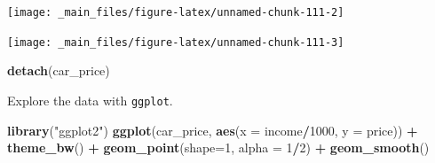 \documentclass[
]{book}
\newenvironment{Shaded}{\begin{snugshade}}{\end{snugshade}}
\newcommand{\CommentTok}[1]{\textcolor[rgb]{0.56,0.35,0.01}{\textit{#1}}}
\newcommand{\DataTypeTok}[1]{\textcolor[rgb]{0.13,0.29,0.53}{#1}}
\newcommand{\DecValTok}[1]{\textcolor[rgb]{0.00,0.00,0.81}{#1}}
\newcommand{\FloatTok}[1]{\textcolor[rgb]{0.00,0.00,0.81}{#1}}
\newcommand{\KeywordTok}[1]{\textcolor[rgb]{0.13,0.29,0.53}{\textbf{#1}}}
\newcommand{\NormalTok}[1]{#1}
\newcommand{\OperatorTok}[1]{\textcolor[rgb]{0.81,0.36,0.00}{\textbf{#1}}}
\newcommand{\StringTok}[1]{\textcolor[rgb]{0.31,0.60,0.02}{#1}}
\begin{document}
\begin{Shaded}
\end{Shaded}

\begin{center}\texttt{[image: \_main\_files/figure-latex/unnamed-chunk-111-2]} \end{center}

\begin{Shaded}
\end{Shaded}

\begin{center}\texttt{[image: \_main\_files/figure-latex/unnamed-chunk-111-3]} \end{center}

\begin{Shaded}
\begin{Highlighting}[]
\KeywordTok{detach}\NormalTok{(car_price)}
\end{Highlighting}
\end{Shaded}

Explore the data with \texttt{ggplot}.

\begin{Shaded}
\begin{Highlighting}[]
\KeywordTok{library}\NormalTok{(}\StringTok{"ggplot2"}\NormalTok{)}
\KeywordTok{ggplot}\NormalTok{(car_price, }\KeywordTok{aes}\NormalTok{(}\DataTypeTok{x =}\NormalTok{ income}\OperatorTok{/}\DecValTok{1000}\NormalTok{, }\DataTypeTok{y =}\NormalTok{ price)) }\OperatorTok{+}
\StringTok{  }\KeywordTok{theme_bw}\NormalTok{() }\OperatorTok{+}
\StringTok{  }\KeywordTok{geom_point}\NormalTok{(}\DataTypeTok{shape=}\DecValTok{1}\NormalTok{, }\DataTypeTok{alpha =} \DecValTok{1}\OperatorTok{/}\DecValTok{2}\NormalTok{) }\OperatorTok{+}\StringTok{ }
\StringTok{  }\KeywordTok{geom_smooth}\NormalTok{() }
\end{Highlighting}
\end{Shaded}
\end{document}
